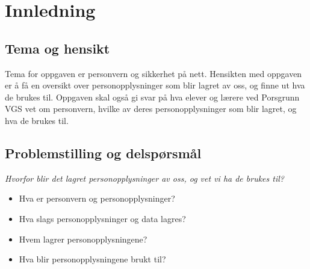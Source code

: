 \section{Innledning}

\subsection{Tema og hensikt}
Tema for oppgaven er personvern og sikkerhet på nett. Hensikten med oppgaven er å få en oversikt over personopplysninger som blir lagret av oss, og finne ut hva de brukes til. Oppgaven skal også gi svar på hva elever og lærere ved Porsgrunn VGS vet om personvern, hvilke av deres personopplysninger som blir lagret, og hva de brukes til.

\subsection{Problemstilling og delspørsmål}\label{sec:problemstilling}

\textit{Hvorfor blir det lagret personopplysninger av oss, og vet vi ha de brukes til?}

\begin{itemize}
    \item Hva er personvern og personopplysninger?
    \item Hva slags personopplysninger og data lagres?
    \item Hvem lagrer personopplysningene?
    \item Hva blir personopplysningene brukt til?
\end{itemize}


\newpage